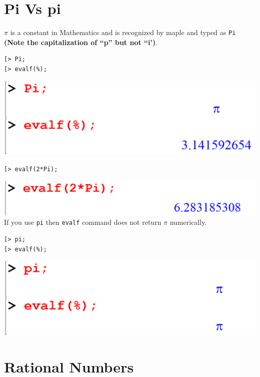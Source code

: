 \documentclass[
]{book}
\theoremstyle{definition}
\theoremstyle{definition}
\theoremstyle{definition}
\theoremstyle{definition}
\theoremstyle{remark}
\begin{document}
\section{Pi Vs pi}\label{pi-vs-pi-1}

\(\pi\) is a constant in Mathematics and is recognized by maple and typed as \texttt{Pi} \textbf{(Note the capitalization of ``p'' but not ``i')}.

\begin{verbatim}
[> Pi;
[> evalf(%);
\end{verbatim}

\includegraphics{figures/Lesson 1/fig31.png}

\begin{verbatim}
[> evalf(2*Pi);
\end{verbatim}

\includegraphics{figures/Lesson 1/fig32.png}
If you use \texttt{pi} then \texttt{evalf} command does not return \(\pi\) numerically.

\begin{verbatim}
[> pi;
[> evalf(%);
\end{verbatim}

\includegraphics{figures/Lesson 1/fig33.png}

\section{Rational Numbers}\label{rational-numbers-1}
\end{document}
